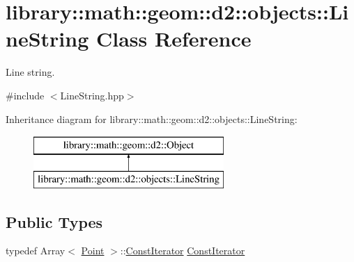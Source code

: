 \hypertarget{classlibrary_1_1math_1_1geom_1_1d2_1_1objects_1_1_line_string}{}\section{library\+:\+:math\+:\+:geom\+:\+:d2\+:\+:objects\+:\+:Line\+String Class Reference}
\label{classlibrary_1_1math_1_1geom_1_1d2_1_1objects_1_1_line_string}


Line string.  




{\ttfamily \#include $<$Line\+String.\+hpp$>$}

Inheritance diagram for library\+:\+:math\+:\+:geom\+:\+:d2\+:\+:objects\+:\+:Line\+String\+:\begin{figure}[H]
\begin{center}
\leavevmode
\includegraphics[height=2.000000cm]{classlibrary_1_1math_1_1geom_1_1d2_1_1objects_1_1_line_string}
\end{center}
\end{figure}
\subsection*{Public Types}
\begin{DoxyCompactItemize}
\item 
typedef Array$<$ \hyperlink{classlibrary_1_1math_1_1geom_1_1d2_1_1objects_1_1_point}{Point} $>$\+::\hyperlink{classlibrary_1_1math_1_1geom_1_1d2_1_1objects_1_1_line_string_a7c7a81b557da8ed855b5f4b88a5fa837}{Const\+Iterator} \hyperlink{classlibrary_1_1math_1_1geom_1_1d2_1_1objects_1_1_line_string_a7c7a81b557da8ed855b5f4b88a5fa837}{Const\+Iterator}
\end{DoxyCompactItemize}
